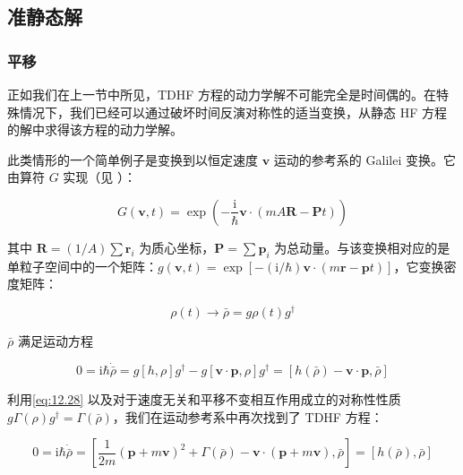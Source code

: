\subsection{准静态解\label{subsec:12.2.3}}

\subsubsection{平移\label{subsubsec:12.2.3.1}}

正如我们在上一节中所见，TDHF 方程的动力学解不可能完全是时间偶的。在特殊情况下，我们已经可以通过破坏时间反演对称性的适当变换，从静态
HF 方程的解中求得该方程的动力学解。

此类情形的一个简单例子是变换到以恒定速度 $\boldsymbol{v}$ 运动的参考系的 Galilei 变换。它由算符 $G$
实现（见 \cite[第十五章]{Me61}）：

\begin{equation}
G(\boldsymbol{v},t)=\exp\left(-\frac{\mathrm{i}}{\hbar}\boldsymbol{v}\cdot(mA\boldsymbol{R}-\boldsymbol{P}t)\right)\label{eq:12.28}
\end{equation}

其中 $\boldsymbol{R}=(1/A)\sum\boldsymbol{r}_{i}$ 为质心坐标，$\boldsymbol{P}=\sum\boldsymbol{p}_{i}$
为总动量。与该变换相对应的是单粒子空间中的一个矩阵：$g(\boldsymbol{v},t)=\exp[-(\mathrm{i}/\hbar)\boldsymbol{v}\cdot(m\boldsymbol{r}-\boldsymbol{p}t)]$，它变换密度矩阵：

\begin{equation}
\rho(t)\to\bar{\rho}=g\rho(t)g^{\dagger}\label{eq:12.29}
\end{equation}

$\bar{\rho}$ 满足运动方程

\begin{equation}
0=\mathrm{i}\hbar\dot{\bar{\rho}}=g[h,\rho]g^{\dagger}-g[\boldsymbol{v}\cdot\boldsymbol{p},\rho]g^{\dagger}=[h(\bar{\rho})-\boldsymbol{v}\cdot\boldsymbol{p},\bar{\rho}]\label{eq:12.30}
\end{equation}

利用\ref{eq:12.28} 以及对于速度无关和平移不变相互作用成立的对称性性质 $g\Gamma(\rho)g^{\dagger}=\Gamma(\bar{\rho})$，我们在运动参考系中再次找到了
TDHF 方程：

\begin{equation}
0=\mathrm{i}\hbar\dot{\bar{\rho}}=\left[\frac{1}{2m}(\boldsymbol{p}+m\boldsymbol{v})^{2}+\Gamma(\bar{\rho})-\boldsymbol{v}\cdot(\boldsymbol{p}+m\boldsymbol{v}),\bar{\rho}\right]=[h(\bar{\rho}),\bar{\rho}]\label{eq:12.31}
\end{equation}

